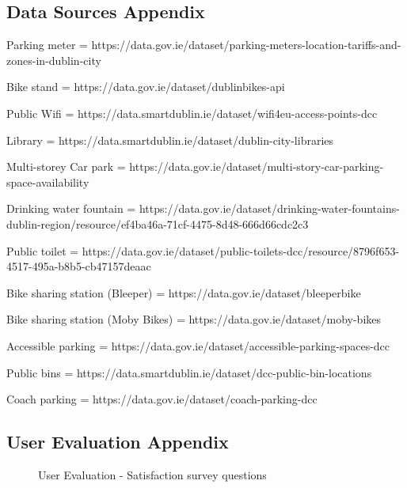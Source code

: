 \subsection{Data Sources Appendix}\label{subsec:data-appendix}
Parking meter = https://data.gov.ie/dataset/parking-meters-location-tariffs-and-zones-in-dublin-city

Bike stand = https://data.gov.ie/dataset/dublinbikes-api

Public Wifi = https://data.smartdublin.ie/dataset/wifi4eu-access-points-dcc

Library = https://data.smartdublin.ie/dataset/dublin-city-libraries

Multi-storey Car park = https://data.gov.ie/dataset/multi-story-car-parking-space-availability

Drinking water fountain = https://data.gov.ie/dataset/drinking-water-fountains-dublin-region/resource/ef4ba46a-71cf-4475-8d48-666d66cdc2c3

Public toilet = https://data.gov.ie/dataset/public-toilets-dcc/resource/8796f653-4517-495a-b8b5-cb47157deaac

Bike sharing station (Bleeper) = https://data.gov.ie/dataset/bleeperbike

Bike sharing station (Moby Bikes) = https://data.gov.ie/dataset/moby-bikes

Accessible parking = https://data.gov.ie/dataset/accessible-parking-spaces-dcc

Public bins = https://data.smartdublin.ie/dataset/dcc-public-bin-locations

Coach parking = https://data.gov.ie/dataset/coach-parking-dcc

\subsection{User Evaluation Appendix}
\begin{figure}[htbp]
    \centering
    \caption{User Evaluation - Satisfaction survey questions}
    \label{fig:userevalquestions}
\end{figure}

